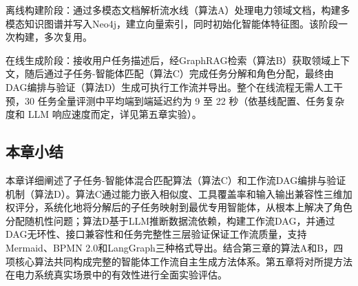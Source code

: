 离线构建阶段：通过多模态文档解析流水线（算法A）处理电力领域文档，构建多模态知识图谱并写入Neo4j，建立向量索引，同时初始化智能体特征图。该阶段一次构建，多次复用。

在线生成阶段：接收用户任务描述后，经GraphRAG检索（算法B）获取领域上下文，随后通过子任务-智能体匹配（算法C）完成任务分解和角色分配，最终由DAG编排与验证（算法D）生成可执行工作流并导出。整个在线流程无需人工干预，30 任务全量评测中平均端到端延迟约为 9 至 22 秒（依基线配置、任务复杂度和 LLM 响应速度而定，详见第五章实验）。

\subsection{本章小结}

本章详细阐述了子任务-智能体混合匹配算法（算法C）和工作流DAG编排与验证机制（算法D）。算法C通过能力嵌入相似度、工具覆盖率和输入输出兼容性三维加权评分，系统化地将分解后的子任务映射到最优专用智能体，从根本上解决了角色分配随机性问题；算法D基于LLM推断数据流依赖，构建工作流DAG，并通过DAG无环性、接口兼容性和任务完整性三层验证保证工作流质量，支持Mermaid、BPMN 2.0和LangGraph三种格式导出。结合第三章的算法A和B，四项核心算法共同构成完整的智能体工作流自主生成方法体系。第五章将对所提方法在电力系统真实场景中的有效性进行全面实验评估。
